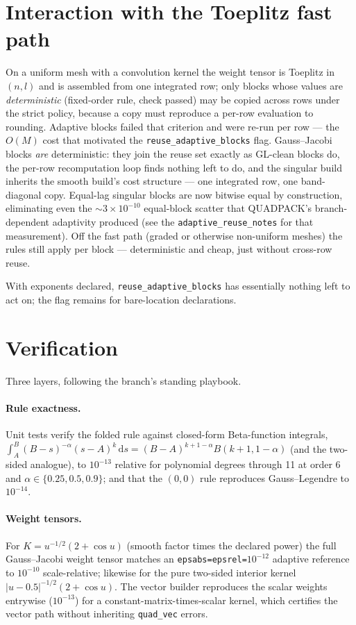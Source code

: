 \documentclass[11pt]{article}
\newcommand{\dd}{\,\mathrm{d}}
\newcommand{\kw}[1]{\texttt{#1}}
\begin{document}
\section{Interaction with the Toeplitz fast path}

On a uniform mesh with a convolution kernel the weight tensor is Toeplitz
in $(n,l)$ and is assembled from one integrated row; only blocks whose
values are \emph{deterministic} (fixed-order rule, check passed) may be
copied across rows under the strict policy, because a copy must reproduce
a per-row evaluation to rounding. Adaptive blocks failed that criterion
and were re-run per row --- the $O(M)$ cost that motivated the
\kw{reuse\_adaptive\_blocks} flag. Gauss--Jacobi blocks \emph{are}
deterministic: they join the reuse set exactly as GL-clean blocks do, the
per-row recomputation loop finds nothing left to do, and the singular
build inherits the smooth build's cost structure --- one integrated row,
one band-diagonal copy. Equal-lag singular blocks are now bitwise equal by
construction, eliminating even the $\sim3\times10^{-10}$ equal-block
scatter that QUADPACK's branch-dependent adaptivity produced (see the
\kw{adaptive\_reuse\_notes} for that measurement). Off the fast path
(graded or otherwise non-uniform meshes) the rules still apply per block
--- deterministic and cheap, just without cross-row reuse.

With exponents declared, \kw{reuse\_adaptive\_blocks} has essentially
nothing left to act on; the flag remains for bare-location declarations.

\section{Verification}

Three layers, following the branch's standing playbook.

\paragraph{Rule exactness.} Unit tests verify the folded rule against
closed-form Beta-function integrals,
$\int_A^B (B-s)^{-\alpha}(s-A)^k \dd s
= (B-A)^{k+1-\alpha}B(k{+}1,1{-}\alpha)$ (and the two-sided analogue), to
$10^{-13}$ relative for polynomial degrees through 11 at order 6 and
$\alpha\in\{0.25,0.5,0.9\}$; and that the $(0,0)$ rule reproduces
Gauss--Legendre to $10^{-14}$.

\paragraph{Weight tensors.} For $K=u^{-1/2}(2+\cos u)$ (smooth factor
times the declared power) the full Gauss--Jacobi weight tensor matches an
\kw{epsabs=epsrel=}$10^{-12}$ adaptive reference to $10^{-10}$
scale-relative; likewise for the pure two-sided interior kernel
$|u-0.5|^{-1/2}(2+\cos u)$. The vector builder reproduces the scalar
weights entrywise ($10^{-13}$) for a constant-matrix-times-scalar kernel,
which certifies the vector path without inheriting \kw{quad\_vec} errors.
\end{document}
